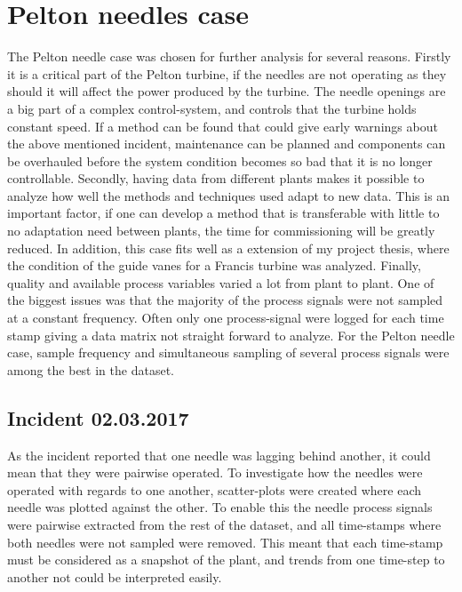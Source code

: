         
        
\section{Pelton needles case}\label{sub:pelton_needles}
    The Pelton needle case was chosen for further analysis for several reasons. Firstly it is a critical part of the Pelton turbine, if the needles are not operating as they should it will affect the power produced by the turbine. The needle openings are a big part of a complex control-system, and controls that the turbine holds constant speed. If a method can be found that could give early warnings about the above mentioned incident, maintenance can be planned and components can be overhauled before the system condition becomes so bad that it is no longer controllable. Secondly, having data from different plants makes it possible to analyze how well the methods and techniques used adapt to new data. This is an important factor, if one can develop a method that is transferable with little to no adaptation need between plants, the time for commissioning will be greatly reduced. In addition, this case fits well as a extension of my project thesis, where the condition of the guide vanes for a Francis turbine was analyzed. Finally, quality and available process variables varied a lot from plant to plant. One of the biggest issues was that the majority of the process signals were not sampled at a constant frequency. Often only one process-signal were logged for each time stamp giving a data matrix not straight forward to analyze. For the Pelton needle case, sample frequency and simultaneous sampling of several process signals were among the best in the dataset.
             

    \subsection{Incident 02.03.2017}
        As the incident reported that one needle was lagging behind another, it could mean that they were pairwise operated. To investigate how the needles were operated with regards to one another, scatter-plots were created where each needle was plotted against the other. To enable this the needle process signals were pairwise extracted from the rest of the dataset, and all time-stamps where both needles were not sampled were removed. This meant that each time-stamp must be considered as a snapshot of the plant, and trends from one time-step to another not could be interpreted easily. 
        
